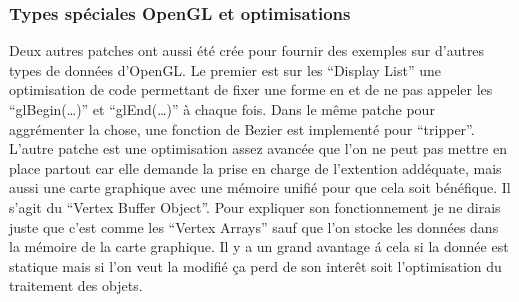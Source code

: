 \subsubsection{Types sp\'eciales OpenGL et optimisations}

Deux autres patches ont aussi \'et\'e cr\'ee pour fournir des exemples sur 
d'autres types de donn\'ees d'OpenGL. Le premier est sur les ``Display List'' 
une optimisation de code permettant de fixer une forme en et de ne pas appeler 
les ``glBegin(\ldots)'' et ``glEnd(\ldots)'' à chaque fois. Dans le 
m\^eme patche pour aggr\'ementer la chose, une fonction de Bezier est 
implement\'e pour ``tripper''. \\
L'autre patche est une optimisation assez avanc\'ee que l'on ne peut pas 
mettre en place partout car elle demande la prise en charge de l'extention 
add\'equate, mais aussi une carte graphique avec une m\'emoire unifi\'e pour 
que cela soit 
b\'en\'efique. Il s'agit du ``Vertex Buffer Object''. Pour expliquer son 
fonctionnement je ne dirais juste que c'est comme les ``Vertex Arrays'' sauf 
que l'on stocke les donn\'ees dans la m\'emoire de la carte graphique. Il y a 
un grand avantage \'a cela si la donn\'ee est statique mais si l'on veut la 
modifi\'e \c{c}a perd de son inter\^et soit l'optimisation du traitement des 
objets.